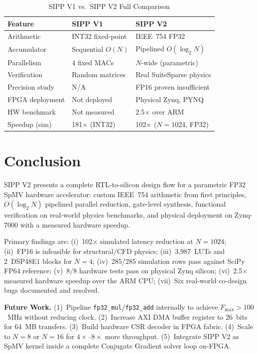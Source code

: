 \documentclass[journal,a4paper]{IEEEtran}
\begin{document}
\begin{table}[!t]
\centering
\caption{SIPP V1 vs.\ SIPP V2 Full Comparison}
\label{tab:v1v2}
\begin{tabular}{lll}
\toprule
\textbf{Feature} & \textbf{SIPP V1} & \textbf{SIPP V2} \\
\midrule
Arithmetic       & INT32 fixed-point & IEEE~754 FP32 \\
Accumulator      & Sequential $O(N)$ & Pipelined $O(\log_2 N)$ \\
Parallelism      & 4 fixed MACs      & $N$-wide (parametric) \\
Verification     & Random matrices   & Real SuiteSparse physics \\
Precision study  & N/A               & FP16 proven insufficient \\
FPGA deployment  & Not deployed      & Physical Zynq, PYNQ \\
HW benchmark     & Not measured      & 2.5$\times$ over ARM \\
Speedup (sim)    & 181$\times$ (INT32) & 102$\times$ ($N=1024$, FP32) \\
\bottomrule
\end{tabular}
\end{table}

\section{Conclusion}

SIPP V2 presents a complete RTL-to-silicon design flow for a parametric
FP32 SpMV hardware accelerator: custom IEEE~754 arithmetic from first
principles, $O(\log_2 N)$ pipelined parallel reduction, gate-level
synthesis, functional verification on real-world physics benchmarks,
and physical deployment on Zynq-7000 with a measured hardware speedup.

Primary findings are:
(i)~102$\times$ simulated latency reduction at $N=1024$;
(ii)~FP16 is infeasible for structural/CFD physics;
(iii)~3,987~LUTs and 2~DSP48E1 blocks for $N=4$;
(iv)~285/285 simulation rows pass against SciPy FP64 reference;
(v)~8/8 hardware tests pass on physical Zynq silicon;
(vi)~2.5$\times$ measured hardware speedup over the ARM CPU;
(vii)~Six real-world co-design bugs documented and resolved.

\textbf{Future Work.}
(1)~Pipeline \texttt{fp32\_mul}/\texttt{fp32\_add} internally to achieve
$F_{\max}>100$~MHz without reducing clock.
(2)~Increase AXI DMA buffer register to 26~bits for 64~MB transfers.
(3)~Build hardware CSR decoder in FPGA fabric.
(4)~Scale to $N=8$ or $N=16$ for $4\times$--$8\times$ more throughput.
(5)~Integrate SIPP V2 as SpMV kernel inside a complete Conjugate
Gradient solver loop on-FPGA.
\end{document}
